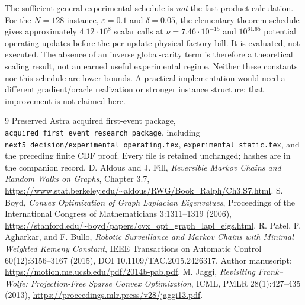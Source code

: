 \documentclass[11pt]{article}
\begin{document}
The sufficient general experimental schedule is \emph{not} the fast
product calculation. For the $N=128$ instance, $\varepsilon=0.1$ and
$\delta=0.05$, the elementary theorem schedule gives approximately
$4.12\cdot10^8$ scalar calls at $\nu=7.46\cdot10^{-15}$ and
$10^{61.65}$ potential operating updates before the per-update physical
factory bill. It is evaluated, not executed. The absence of an inverse
global-rarity term is therefore a theoretical scaling result, not an
earned useful experimental regime. Neither these constants nor this
schedule are lower bounds. A practical implementation would need a
different gradient/oracle realization or stronger instance structure;
that improvement is not claimed here.

\begin{thebibliography}{9}
 Preserved Astra acquired first-event package,
\texttt{acquired\_first\_event\_research\_package}, including
\texttt{next5\_decision/experimental\_operating.tex},
\texttt{experimental\_static.tex}, and the preceding finite CDF proof.
Every file is retained unchanged; hashes are in the companion record.
 D. Aldous and J. Fill, \emph{Reversible Markov Chains and
Random Walks on Graphs}, Chapter 3.7,
\url{https://www.stat.berkeley.edu/~aldous/RWG/Book_Ralph/Ch3.S7.html}.
 S. Boyd, \emph{Convex Optimization of Graph Laplacian
Eigenvalues}, Proceedings of the International Congress of Mathematicians
3:1311--1319 (2006),
\url{https://stanford.edu/~boyd/papers/cvx_opt_graph_lapl_eigs.html}.
 R. Patel, P. Agharkar, and F. Bullo,
\emph{Robotic Surveillance and Markov Chains with Minimal Weighted Kemeny
Constant}, IEEE Transactions on Automatic Control 60(12):3156--3167
(2015), DOI 10.1109/TAC.2015.2426317. Author manuscript:
\url{https://motion.me.ucsb.edu/pdf/2014b-pab.pdf}.
 M. Jaggi, \emph{Revisiting Frank--Wolfe: Projection-Free
Sparse Convex Optimization}, ICML, PMLR 28(1):427--435 (2013),
\url{https://proceedings.mlr.press/v28/jaggi13.pdf}.
\end{thebibliography}
\end{document}

